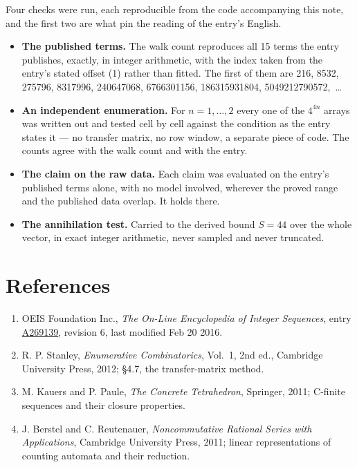\documentclass[11pt]{article}
\theoremstyle{definition}
\begin{document}
Four checks were run, each reproducible from the code accompanying this note, and the first two are what pin the reading of the entry's English.

\begin{itemize}

\item {\bfseries The published terms.} The walk count reproduces all 15 terms the entry publishes, exactly, in integer arithmetic, with the index taken from the entry's stated offset (1) rather than fitted. The first of them are 216, 8532, 275796, 8317996, 240647068, 6766301156, 186315931804, 5049212790572,~\dots

\item {\bfseries An independent enumeration.} For $n = 1,\dots,2$ every one of the $4^{4n}$ arrays was written out and tested cell by cell against the condition as the entry states it --- no transfer matrix, no row window, a separate piece of code. The counts agree with the walk count and with the entry.

\item {\bfseries The claim on the raw data.} Each claim was evaluated on the entry's published terms alone, with no model involved, wherever the proved range and the published data overlap. It holds there.

\item {\bfseries The annihilation test.} Carried to the derived bound $S = 44$ over the whole vector, in exact integer arithmetic, never sampled and never truncated.

\end{itemize}

\section{References}

\begin{enumerate}

\item OEIS Foundation Inc., \emph{The On-Line Encyclopedia of Integer Sequences}, entry \href{https://oeis.org/A269139}{A269139}, revision 6, last modified Feb 20 2016.

\item R. P. Stanley, \emph{Enumerative Combinatorics}, Vol.~1, 2nd ed., Cambridge University Press, 2012; \S4.7, the transfer-matrix method.

\item M. Kauers and P. Paule, \emph{The Concrete Tetrahedron}, Springer, 2011; C-finite sequences and their closure properties.

\item J. Berstel and C. Reutenauer, \emph{Noncommutative Rational Series with Applications}, Cambridge University Press, 2011; linear representations of counting automata and their reduction.

\end{enumerate}
\end{document}
